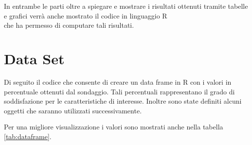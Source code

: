 \documentclass[]{book}
\begin{document}
In entrambe le parti oltre a spiegare e mostrare i risultati ottenuti
tramite tabelle e grafici verrà anche mostrato il codice in linguaggio
R\\
\citep{rlang} che ha permesso di computare tali risultati.

\chapter{Data Set}\label{data-set}

Di seguito il codice che consente di creare un data frame in R con i
valori in percentuale ottenuti dal sondaggio. Tali percentuali
rappresentano il grado di soddisfazione per le caratteristiche di
interesse. Inoltre sono state definiti alcuni oggetti che saranno
utilizzati successivamente.

Per una migliore visualizzazione i valori sono mostrati anche nella
tabella \ref{tab:dataframe}.
\end{document}
